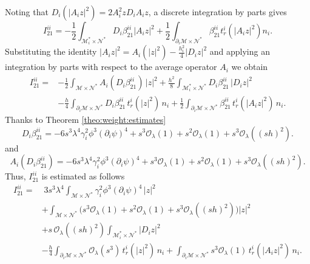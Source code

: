 \documentclass[11pt,oneside,leqno]{amsart}
\numberwithin{equation}{section}
\numberwithin{equation}{section}
\begin{document}
Noting that $D_{i}(|A_{i}z|^{2})=2A_{i}^{2}zD_{i}A_{i}z$, a discrete integration by parts gives
\begin{equation*}
I_{21}^{ii}=-\frac{1}{2}\int_{\mathcal{M}^{\ast}_{i}\times\mathcal{N}^{\ast}}D_{i}\beta_{21}^{ii}|A_{i}z|^{2}+\frac{1}{2}\int_{\partial_{i}\mathcal{M}\times\mathcal{N}^{\ast}}\beta_{21}^{ii}t_{r}^{i}(|A_{i}z|^{2})n_{i}.
\end{equation*}
Substituting the identity $|A_{i}z|^{2}=A_{i}(|z|^{2})-\frac{h_{i}^{2}}{4}|D_{i}z|^{2}$ and applying an integration by parts with respect to the average operator $A_{i}$ we obtain
\begin{equation}\label{eq:I21:ii:expanded}
\begin{aligned}
I_{21}^{ii}=&-\frac{1}{2}\int_{\mathcal{M}\times\mathcal{N}^{\ast}}A_{i}(D_{i}\beta_{21}^{ii})\,|z|^{2}+\frac{h^{2}}{8}\int_{\mathcal{M}_{i}^{\ast}\times\mathcal{N}^{\ast}}D_{i}\beta_{21}^{ii}\,|D_{i}z|^{2}\\
&-\frac{h}{4}\int_{\partial_{i}\mathcal{M}\times\mathcal{N}^{\ast}}D_{i}\beta_{21}^{ii}\,t_{r}^{i}(|z|^{2})\,n_{i}+\frac{1}{2}\int_{\partial_{i}\mathcal{M}\times\mathcal{N}^{\ast}}\beta_{21}^{ii}\,t_{r}^{i}(|A_{i}z|^{2})\,n_{i}.
\end{aligned}
\end{equation}
Thanks to Theorem \ref{theo:weight:estimates}
\begin{equation}\label{eq:Di:beta21:ii:estimate}
D_{i}\beta_{21}^{ii}=-6s^{3}\lambda^{4}\gamma_{i}^{2}\phi^{3}(\partial_{i}\psi)^{4}+s^{3}\mathcal{O}_{\lambda}(1)+s^{2}\mathcal{O}_{\lambda}(1)+s^{3}\mathcal{O}_{\lambda}((sh)^{2}).
\end{equation}
and 
\begin{equation}\label{eq:Ai:Di:beta21:ii:estimate}
A_{i}(D_{i}\beta_{21}^{ii})=-6s^{3}\lambda^{4}\gamma_{i}^{2}\phi^{3}(\partial_{i}\psi)^{4}+s^{3}\mathcal{O}_{\lambda}(1)+s^{2}\mathcal{O}_{\lambda}(1)+s^{3}\mathcal{O}_{\lambda}((sh)^{2}).
\end{equation}
Thus, $I_{21}^{ii}$ is estimated as follows
\begin{equation}\label{eq:I21:ii:final}
\begin{aligned}
I_{21}^{ii}=&\;3s^{3}\lambda^{4}\int_{\mathcal{M}\times\mathcal{N}^{\ast}}\gamma_{i}^{2}\phi^{3}(\partial_{i}\psi)^{4}\,|z|^{2}\\
&+\int_{\mathcal{M}\times\mathcal{N}^{\ast}}\Big(s^{3}\mathcal{O}_{\lambda}(1)+s^{2}\mathcal{O}_{\lambda}(1)+s^{3}\mathcal{O}_{\lambda}((sh)^{2})\Big)|z|^{2}\\
&+s\,\mathcal{O}_{\lambda}((sh)^{2})\int_{\mathcal{M}_{i}^{\ast}\times\mathcal{N}^{\ast}}|D_{i}z|^{2}\\
&-\frac{h}{4}\int_{\partial_{i}\mathcal{M}\times\mathcal{N}^{\ast}}\mathcal{O}_{\lambda}(s^{3})\,t_{r}^{i}(|z|^{2})\,n_{i}+\int_{\partial_{i}\mathcal{M}\times\mathcal{N}^{\ast}}s^{3}\mathcal{O}_{\lambda}(1)\,t_{r}^{i}(|A_{i}z|^{2})\,n_{i}.
\end{aligned}
\end{equation}
\end{document}
